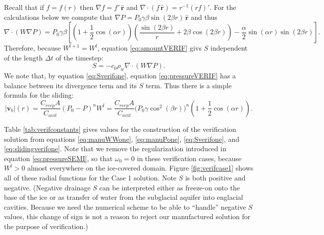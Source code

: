 \documentclass[11pt]{amsart}
\newcommand{\bv}{\mathbf{v}}
\newcommand{\Cavit}{C_{avit}}
\newcommand{\Creep}{C_{reep}}
\begin{document}
\newcommand{\hbr}{\,\hat{\mathbf{r}}}
Recall that if $f=f(r)$ then $\nabla f = f' \hbr$ and $\nabla\cdot\left(f\hbr\right) = r^{-1}\left(r f\right)'$.  For the calculations below we compute that $\nabla P = P_0 \gamma \beta \sin(2 \beta r)\hbr$ and thus
\begin{equation*}
\nabla \cdot \left(W \nabla P\right) = P_0 \gamma \beta \left[\left(1 + \frac{1}{2} \cos(\alpha r)\right) \left(\frac{\sin(2\beta r)}{r} + 2 \beta \cos(2\beta r)\right) - \frac{\alpha}{2} \sin(\alpha r) \sin(2\beta r)\right].
\end{equation*}
Therefore, because $W^{l+1}=W^l$, equation \eqref{eq:amountVERIF} givs $S$ independent of the length $\Delta t$ of the timestep:
\begin{equation}
S = - c_0 \rho_w \nabla \cdot \left(W \nabla P\right). \label{eq:Sverifone}
\end{equation}
We note that, by equation \eqref{eq:Sverifone}, equation \eqref{eq:pressureVERIF} has a balance between its divergence term and its $S$ term.  Thus there is a simple formula for the sliding:
\begin{equation}
|\bv_b|(r) = \frac{\Creep A}{\Cavit} (P_0-P)^n W^l = \frac{\Creep A}{\Cavit} \Big(P_0 \gamma  \cos^2(\beta r)\Big)^n \left(1 + \frac{1}{2} \cos(\alpha r)\right). \label{eq:slidingverifone} 
\end{equation}

Table \ref{tab:verifconstants} gives values for the construction of the verification solution from equations \eqref{eq:manuWWone}, \eqref{eq:manuPone}, \eqref{eq:Sverifone}, and \eqref{eq:slidingverifone}.  Note that we remove the regularization introduced in equation \eqref{eq:pressureSEMI}, so that $\omega_0 = 0$ in these verification cases, because $W^l>0$ almost everywhere on the ice-covered domain.  Figure \ref{fig:verifcase1} shows all of these radial functions for the Case 1 solution.  Note $S$ is both positive and negative.  (Negative drainage $S$ can be interpreted either as freeze-on onto the base of the ice or as transfer of water from the subglacial aquifer into englacial cavities.  Because we need the numerical scheme to be able to ``handle'' negative $S$ values, this change of sign is not a reason to reject our manufactured solution for the purpose of verification.)
\end{document}
